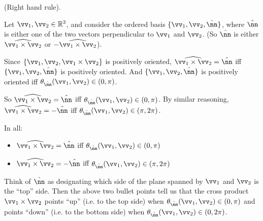 \begin{deriv}
    (Right hand rule).
        
    Let $\vv_1, \vv_2 \in \R^3$, and consider the ordered basis $\{\vv_1, \vv_2, \hat{\nn}\}$, where $\hat{\nn}$ is either one of the two vectors perpendicular to $\vv_1$ and $\vv_2$. (So $\hat{\nn}$ is either $\widehat{\vv_1 \times \vv_2}$ or $-\widehat{\vv_1 \times \vv_2}$).
    
    Since $\{\vv_1, \vv_2, \vv_1 \times \vv_2\}$ is positively oriented, $\widehat{\vv_1 \times \vv_2} = \hat{\nn}$ iff $\{\vv_1, \vv_2, \hat{\nn}\}$ is positively oriented. And $\{\vv_1, \vv_2, \hat{\nn}\}$ is positively oriented iff $\theta_{\hat{\nn}}(\vv_1, \vv_2) \in (0, \pi)$.
    
    So $\widehat{\vv_1 \times \vv_2} = \hat{\nn}$ iff $\theta_{\hat{\nn}}(\vv_1, \vv_2) \in (0, \pi)$. By similar reasoning, $\widehat{\vv_1 \times \vv_2} = -\hat{\nn}$ iff $\theta_{\hat{\nn}}(\vv_1, \vv_2) \in (\pi, 2\pi)$.
    
    In all:
    
    \begin{itemize}
        \item $\widehat{\vv_1 \times \vv_2} = \hat{\nn}$ iff $\theta_{\hat{\nn}}(\vv_1, \vv_2) \in (0, \pi)$
        \item $\widehat{\vv_1 \times \vv_2} = -\hat{\nn}$ iff $\theta_{\hat{\nn}}(\vv_1, \vv_2) \in (\pi, 2\pi)$
    \end{itemize}
    
    Think of $\hat{\nn}$ as designating which side of the plane spanned by $\vv_1$ and $\vv_2$ is the ``top'' side. Then the above two bullet points tell us that the cross product $\vv_1 \times \vv_2$ points ``up'' (i.e. to the top side) when $\theta_{\hat{\nn}}(\vv_1, \vv_2) \in (0, \pi)$ and points ``down'' (i.e. to the bottom side) when $\theta_{\hat{\nn}}(\vv_1, \vv_2) \in (0, 2\pi)$.
    
        
\end{deriv}

